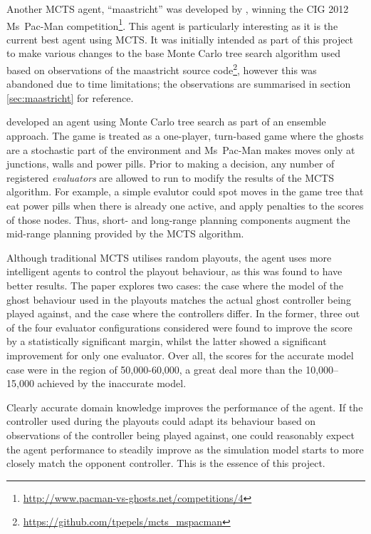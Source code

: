 Another MCTS agent, ``maastricht'' was developed by \citet{Pepels2012}, winning the CIG 2012 Ms~Pac-Man competition\footnote{\url{http://www.pacman-vs-ghosts.net/competitions/4}}.  This agent is particularly interesting as it is the current best agent using MCTS.  It was initially intended as part of this project to make various changes to the base Monte Carlo tree search algorithm used based on observations of the maastricht source code\footnote{\url{https://github.com/tpepels/mcts_mspacman}}, however this was abandoned due to time limitations; the observations are summarised in section \ref{sec:maastricht} for reference.

\citet{Me2012} developed an agent using Monte Carlo tree search as part of an ensemble approach.  The game is treated as a one-player, turn-based game where the ghosts are a stochastic part of the environment and Ms~Pac-Man makes moves only at junctions, walls and power pills.  Prior to making a decision, any number of registered \emph{evaluators} are allowed to run to modify the results of the MCTS algorithm.  For example, a simple evalutor could spot moves in the game tree that eat power pills when there is already one active, and apply penalties to the scores of those nodes.  Thus, short- and long-range planning components augment the mid-range planning provided by the MCTS algorithm.

Although traditional MCTS utilises random playouts, the agent uses more intelligent agents to control the playout behaviour, as this was found to have better results.  The paper explores two cases: the case where the model of the ghost behaviour used in the playouts matches the actual ghost controller being played against, and the case where the controllers differ.  In the former, three out of the four evaluator configurations considered were found to improve the score by a statistically significant margin, whilst the latter showed a significant improvement for only one evaluator.  Over all, the scores for the accurate model case were in the region of 50,000-60,000, a great deal more than the 10,000--15,000 achieved by the inaccurate model.

Clearly accurate domain knowledge improves the performance of the agent.  If the controller used during the playouts could adapt its behaviour based on observations of the controller being played against, one could reasonably expect the agent performance to steadily improve as the simulation model starts to more closely match the opponent controller.  This is the essence of this project.

